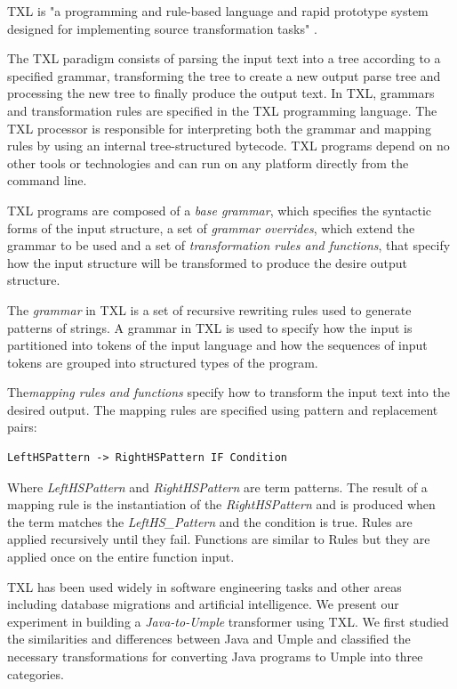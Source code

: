 TXL is "a programming and rule-based language and rapid prototype system designed for implementing source transformation tasks" \cite{Cordy2006}.

The TXL paradigm consists of parsing the input text into a tree according to a specified grammar, transforming the tree to create a new output parse tree and processing the new tree to finally produce the output text. In TXL, grammars and transformation rules are specified in the TXL programming language. The TXL processor is responsible for interpreting both the grammar and mapping rules by using an internal tree-structured bytecode. TXL programs depend on no other tools or technologies and can run on any platform directly from the command line.

TXL programs are composed of a\textit{ base grammar}, which specifies the syntactic forms of the input structure, a set of \textit{grammar overrides}, which extend the grammar to be used and a set of \textit{transformation rules and functions}, that specify how the input structure will be transformed to produce the desire output structure.

The \textit{grammar} in TXL is a set of recursive rewriting rules used to generate patterns of strings. A grammar in TXL is used to specify how the input is partitioned into tokens of the input language and how the sequences of input tokens are grouped into structured types of the program. 

The\textit{mapping rules and functions} specify how to transform the input text into the desired output. The mapping rules are specified using pattern and replacement pairs: 

\vspace{\baselineskip}
\begin{lstlisting}[style=umplePlain]
LeftHSPattern -> RightHSPattern IF Condition
\end{lstlisting}

Where \textit{LeftHSPattern} and \textit{RightHSPattern} are term patterns. The result of a mapping rule is the instantiation of the \textit{RightHSPattern} and is produced when the term matches the \textit{LeftHS\_Pattern} and the condition is true. Rules are applied recursively until they fail. Functions are similar to Rules but they are applied once on the entire function input.

TXL has been used widely in software engineering tasks and other areas including database migrations and artificial intelligence. We present our experiment in building a \textit{Java-to-Umple} transformer using TXL. We first studied the similarities and differences between Java and Umple and classified the necessary transformations for converting Java programs to Umple into three categories.

